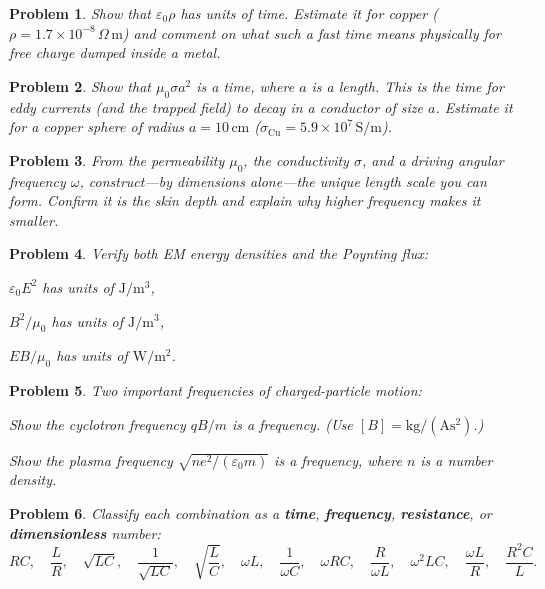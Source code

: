 \documentclass[11pt]{article}
\newcommand{\clearpts}{\addtocounter{tpts}{\value{cpts}} \setcounter{cpts}{0}}
\newcommand{\pts}[1]{\clearpts \setcounter{cpts}{#1}}
\theoremstyle{mystyle}
\newtheorem{pproblem}{Problem}
\newcommand{\A}{\text{A}}
\newcommand{\s}{\text{s}}
\newcommand{\m}{\text{m}}
\begin{document}
\pts{3}
\begin{pproblem}
Show that $\varepsilon_0\rho$ has units of time. Estimate it for copper
($\rho = 1.7\times10^{-8}\,\Omega\,\m$) and comment on what such a fast time means
physically for free charge dumped inside a metal.
\end{pproblem}

\pts{4}
\begin{pproblem}
Show that $\mu_0\sigma a^2$ is a time, where $a$ is a length. This is the time for
eddy currents (and the trapped field) to decay in a conductor of size $a$. Estimate it
for a copper sphere of radius $a = 10\,\text{cm}$ ($\sigma_{\text{Cu}}=5.9\times10^{7}\,
\text{S/m}$).
\end{pproblem}

\pts{4}
\begin{pproblem}
From the permeability $\mu_0$, the conductivity $\sigma$, and a driving angular
frequency $\omega$, construct---by dimensions alone---the unique length scale you can
form. Confirm it is the skin depth and explain why higher frequency makes it smaller.
\end{pproblem}

\pts{4}
\begin{pproblem}
Verify both EM energy densities and the Poynting flux:
\begin{subpart}
\item $\varepsilon_0 E^2$ has units of $\text{J}/\m^3$,
\item $B^2/\mu_0$ has units of $\text{J}/\m^3$,
\item $EB/\mu_0$ has units of $\text{W}/\m^2$.
\end{subpart}
\end{pproblem}

\pts{4}
\begin{pproblem}
Two important frequencies of charged-particle motion:
\begin{subpart}
\item Show the cyclotron frequency $qB/m$ is a frequency. (Use $[B]=\text{kg}/(\A\s^2)$.)
\item Show the plasma frequency $\sqrt{ne^2/(\varepsilon_0 m)}$ is a frequency, where
$n$ is a number density.
\end{subpart}
\end{pproblem}

\pts{4}
\begin{pproblem}
Classify each combination as a \textbf{time}, \textbf{frequency}, \textbf{resistance},
or \textbf{dimensionless} number:
\[
RC,\quad \frac{L}{R},\quad \sqrt{LC},\quad \frac{1}{\sqrt{LC}},\quad
\sqrt{\frac{L}{C}},\quad \omega L,\quad \frac{1}{\omega C},\quad
\omega RC,\quad \frac{R}{\omega L},\quad \omega^2 LC,\quad
\frac{\omega L}{R},\quad \frac{R^2C}{L}.
\]
\end{pproblem}
\end{document}
